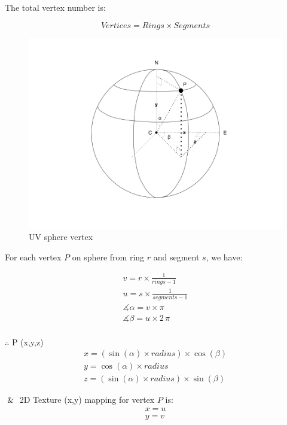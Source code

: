 The total vertex number is:

\begin{equation}
\label{equ:uv-sphere-vertices}
Vertices = Rings \times Segments
\end{equation}

\begin{figure}[H]
\caption[uv-sphere-vertex]{UV sphere vertex}
\label{fig:uv-sphere-vertex}
\centering
\includegraphics[width=\linewidth]{Figures/uv-sphere-vertex.png}
\decoRule
\end{figure}

For each vertex $P$ on sphere from ring $r$ and segment $s$, we have:

\[
\begin{array}{lr}
v = r \times  \frac{1}{rings - 1} \\
u = s \times  \frac{1}{segments - 1} \\
\measuredangle \alpha = v \times \pi \\
\measuredangle \beta = u \times 2\,\pi \\
\end{array}
\]

$\therefore$ P (x,\;y,\;z)
\[
\begin{array}{lr}
x = (\sin(\alpha) \times radius) \times \cos(\beta) \\
y = \cos(\alpha) \times radius \\
z =  (\sin(\alpha) \times radius) \times \sin(\beta)
\end{array}
\]

$\And$ 2D Texture (x,\;y) mapping for vertex $P$ is:
\[
\begin{array}{lr}
x = u \\
y = v \\
\end{array}
\]

